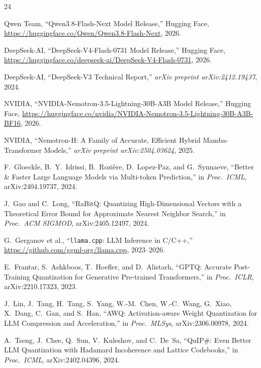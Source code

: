 \documentclass[10pt,twocolumn]{article}
\begin{document}
\FloatBarrier
\raggedbottom
{\small
\begin{thebibliography}{24}
\setlength{\itemsep}{1.5pt}
\setlength{\parskip}{0pt}

Qwen Team, ``Qwen3.8-Flash-Next Model Release,'' Hugging Face, \url{https://huggingface.co/Qwen/Qwen3.8-Flash-Next}, 2026.

DeepSeek-AI, ``DeepSeek-V4-Flash-0731 Model Release,'' Hugging Face, \url{https://huggingface.co/deepseek-ai/DeepSeek-V4-Flash-0731}, 2026.

DeepSeek-AI, ``DeepSeek-V3 Technical Report,'' \emph{arXiv preprint arXiv:2412.19437}, 2024.

NVIDIA, ``NVIDIA-Nemotron-3.5-Lightning-30B-A3B Model Release,'' Hugging Face, \url{https://huggingface.co/nvidia/NVIDIA-Nemotron-3.5-Lightning-30B-A3B-BF16}, 2026.

NVIDIA, ``Nemotron-H: A Family of Accurate, Efficient Hybrid Mamba-Transformer Models,'' \emph{arXiv preprint arXiv:2504.03624}, 2025.

F.~Gloeckle, B.~Y.~Idrissi, B.~Rozi\`ere, D.~Lopez-Paz, and G.~Synnaeve, ``Better \& Faster Large Language Models via Multi-token Prediction,'' in \emph{Proc.\ ICML}, arXiv:2404.19737, 2024.

J.~Gao and C.~Long, ``RaBitQ: Quantizing High-Dimensional Vectors with a Theoretical Error Bound for Approximate Nearest Neighbor Search,'' in \emph{Proc.\ ACM SIGMOD}, arXiv:2405.12497, 2024.

G.~Gerganov et al., ``\texttt{llama.cpp}: LLM Inference in C/C++,'' \url{https://github.com/ggml-org/llama.cpp}, 2023--2026.

E.~Frantar, S.~Ashkboos, T.~Hoefler, and D.~Alistarh, ``GPTQ: Accurate Post-Training Quantization for Generative Pre-trained Transformers,'' in \emph{Proc.\ ICLR}, arXiv:2210.17323, 2023.

J.~Lin, J.~Tang, H.~Tang, S.~Yang, W.-M.~Chen, W.-C.~Wang, G.~Xiao, X.~Dang, C.~Gan, and S.~Han, ``AWQ: Activation-aware Weight Quantization for LLM Compression and Acceleration,'' in \emph{Proc.\ MLSys}, arXiv:2306.00978, 2024.

A.~Tseng, J.~Chee, Q.~Sun, V.~Kuleshov, and C.~De~Sa, ``QuIP\#: Even Better LLM Quantization with Hadamard Incoherence and Lattice Codebooks,'' in \emph{Proc.\ ICML}, arXiv:2402.04396, 2024.


\end{thebibliography}}
\end{document}
